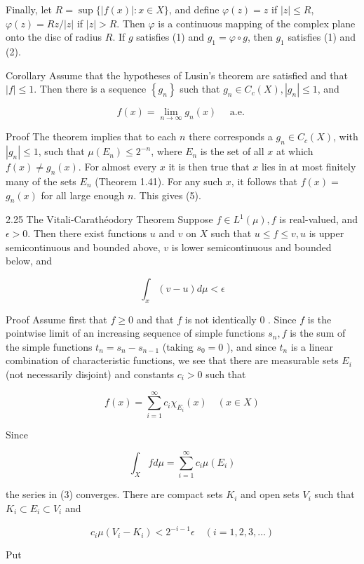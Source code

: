 \documentclass[10pt]{article}
\begin{document}
Finally, let $R=\sup \{|f(x)|: x \in X\}$, and define $\varphi(z)=z$ if $|z| \leq R$, $\varphi(z)=R z /|z|$ if $|z|>R$. Then $\varphi$ is a continuous mapping of the complex plane onto the disc of radius $R$. If $g$ satisfies (1) and $g_{1}=\varphi \circ g$, then $g_{1}$ satisfies (1) and (2).

Corollary Assume that the hypotheses of Lusin's theorem are satisfied and that $|f| \leq 1$. Then there is a sequence $\left\{g_{n}\right\}$ such that $g_{n} \in C_{c}(X),\left|g_{n}\right| \leq 1$, and

$$
f(x)=\lim _{n \rightarrow \infty} g_{n}(x) \quad \text { a.e. }
$$

Proof The theorem implies that to each $n$ there corresponds a $g_{n} \in C_{c}(X)$, with $\left|g_{n}\right| \leq 1$, such that $\mu\left(E_{n}\right) \leq 2^{-n}$, where $E_{n}$ is the set of all $x$ at which $f(x) \neq g_{n}(x)$. For almost every $x$ it is then true that $x$ lies in at most finitely many of the sets $E_{n}$ (Theorem 1.41). For any such $x$, it follows that $f(x)=$ $g_{n}(x)$ for all large enough $n$. This gives (5).

2.25 The Vitali-Carathéodory Theorem Suppose $f \in L^{1}(\mu), f$ is real-valued, and $\epsilon>0$. Then there exist functions $u$ and $v$ on $X$ such that $u \leq f \leq v, u$ is upper semicontinuous and bounded above, $v$ is lower semicontinuous and bounded below, and

$$
\int_{x}(v-u) d \mu<\epsilon
$$

Proof Assume first that $f \geq 0$ and that $f$ is not identically 0 . Since $f$ is the pointwise limit of an increasing sequence of simple functions $s_{n}, f$ is the sum of the simple functions $t_{n}=s_{n}-s_{n-1}$ (taking $s_{0}=0$ ), and since $t_{n}$ is a linear combination of characteristic functions, we see that there are measurable sets $E_{i}$ (not necessarily disjoint) and constants $c_{i}>0$ such that

$$
f(x)=\sum_{i=1}^{\infty} c_{i} \chi_{E_{i}}(x) \quad(x \in X)
$$

Since

$$
\int_{X} f d \mu=\sum_{i=1}^{\infty} c_{i} \mu\left(E_{i}\right)
$$

the series in (3) converges. There are compact sets $K_{i}$ and open sets $V_{i}$ such that $K_{i} \subset E_{i} \subset V_{i}$ and

$$
c_{i} \mu\left(V_{i}-K_{i}\right)<2^{-i-1} \epsilon \quad(i=1,2,3, \ldots)
$$

Put
\end{document}
